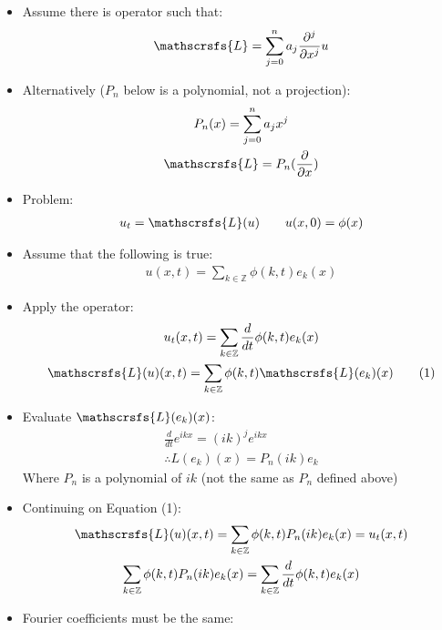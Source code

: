 \documentclass[12pt, a4paper]{article}
\begin{document}
\begin{itemize}
    \item Assume there is operator such that:
    \begin{gather*}
        \mathscrsfs{L} = \sum_{j=0}^n a_j \frac{\partial^j}{\partial x^j}u
    \end{gather*}
    \item Alternatively ($P_n$ below is a polynomial, not a projection):
    \begin{gather*}
        P_n(x) = \sum_{j=0}^na_jx^j\\
        \mathscrsfs{L} = P_n(\frac{\partial}{\partial x})
    \end{gather*}
    \item Problem:
    \begin{gather*}
        u_t = \mathscrsfs{L}(u) \qquad u(x, 0) = \phi(x)
    \end{gather*}   
    \item Assume that the following is true:
    \begin{gather*}
        u(x, t) = \sum_{k \in \mathbb{Z}} \phi(k, t)e_k(x) 
    \end{gather*}   
    \item Apply the operator:
    \begin{gather*}
        u_t(x, t) = \sum_{k \in \mathbb{Z}} \frac{d}{dt}\phi(k, t)e_k(x)\\
        \mathscrsfs{L}(u)(x, t) = \sum_{k \in \mathbb{Z}}\phi(k, t)\mathscrsfs{L}(e_k)(x) \qquad (1)
    \end{gather*}
    \item Evaluate $\mathscrsfs{L}(e_k)(x)$:
    \begin{gather*}
        \frac{d}{dt}e^{ikx} = (ik)^je^{ikx}\\
        \therefore {L}(e_k)(x) = P_n(ik)e_k
    \end{gather*}
    Where $P_n$ is a polynomial of $ik$ (not the same as $P_n$ defined above)
    \item Continuing on Equation (1):
    \begin{gather*}
        \mathscrsfs{L}(u)(x, t) = \sum_{k \in \mathbb{Z}} \phi(k, t)P_n(ik)e_k(x) = u_t(x, t)\\
        \sum_{k \in \mathbb{Z}} \phi(k, t)P_n(ik)e_k(x) = \sum_{k \in \mathbb{Z}} \frac{d}{dt}\phi(k, t)e_k(x)
    \end{gather*}
    \item Fourier coefficients must be the same:
    \begin{gather*}

\end{gather*}
\end{itemize}
\end{document}
